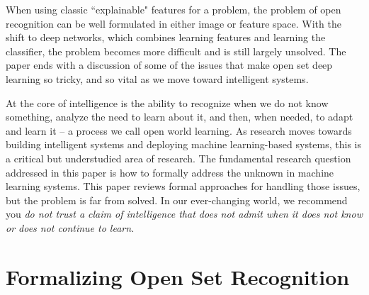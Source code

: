 \documentclass[letterpaper]{article}
\begin{document}
When using classic ``explainable" features for a problem, the problem of open recognition can be well formulated in either image or feature space.  With the shift to deep networks, which combines learning features and learning the classifier,  the problem becomes more difficult and is still largely unsolved.  The paper ends with a discussion of some of the issues that make open set deep learning so tricky, and so vital as we move toward intelligent systems.


At the core of intelligence is the ability to recognize when we do not know something, analyze the need to learn about it, and then, when needed, to adapt and learn it -- a process we call open world learning. 
As research moves towards building intelligent systems and deploying machine learning-based systems, this is a critical but understudied area of research. The fundamental research question addressed in this paper is how to formally address the unknown in machine learning systems. This paper reviews formal approaches for handling those issues, but the problem is far from solved.  In our ever-changing world,  we recommend you {\em do not trust a claim of intelligence that does not admit when it does not know or does not continue to learn.}     


\section{Formalizing Open Set Recognition}
\label{sec:theory}
\end{document}
